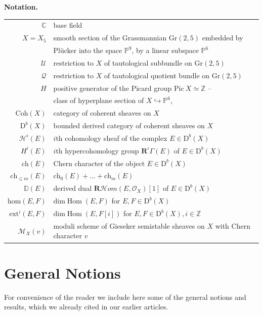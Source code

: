 \documentclass{amsart}
\DeclareMathOperator{\Hom}{Hom}
\def\Z{\ensuremath{\mathbb{Z}}}
\begin{document}
	\textbf{Notation.}
	\begin{center}
		\begin{tabular}{ r l }
			$\mathbb C$ & base field\ \\
			$X=X_5$ & smooth section of the Grassmannian $\mathrm{Gr}(2,5)$ embedded by\\
			& Pl\"ucker into the space $\mathbb P^9$, by a linear subspace $\mathbb P^6$\\
			$\mathcal U$ & restriction to $X$ of tautological subbundle on $\mathrm{Gr}(2,5)$\\
			$\mathcal Q$ & restriction to $X$ of tautological quotient bundle on $\mathrm{Gr}(2,5)$\\
			$H$ & positive generator of the Picard group $\mathrm{Pic}\ X\simeq\Z$ --\\ &
			class of hyperplane section of $X\hookrightarrow
			\mathbb P^6$,\\
			$\mathrm{Coh}(X)$ & category of coherent sheaves on $X$\\
			$\mathrm D^b(X)$ & bounded derived category of coherent sheaves on
			$X$\\
			$\mathcal H^{i}(E)$ & $i$th cohomology sheaf of the complex $E\in\mathrm
			D^b(X)$ \\
			$H^{i}(E)$ & $i$th hypercohomology group $\mathbf R^i\Gamma(E)$ of $E\in\mathrm
			D^b(X)$\\
			$\mathrm{ch}(E)$ & Chern character of the object $E \in\mathrm D^b(X)$ \\
			$\mathrm{ch}_{\le m}(E)$ & $\mathrm{ch}_0(E)+ \ldots+ \mathrm{ch}_m(E)$ \\
			$\mathbb D(E)$ & derived dual $\mathbf{R}\mathcal{H}om(E,\mathcal O_X)[1]$ of $E\in\mathrm
			D^b(X)$ \\
			$\mathrm{hom}(E,F)$ & $\mathrm{dim} \Hom(E,F)$ for $E,F\in\mathrm D^b(X)$ \\
			$\mathrm{ext}^i(E,F)$ & $\mathrm{dim} \Hom(E,F[i])$ for $E,F\in\mathrm D^b(X),i\in\mathbb Z$ \\
			$\mathcal M_X(v)$ & moduli scheme of Gieseker semistable sheaves on $X$ with Chern character $v$
		\end{tabular}
	\end{center}
	
	\section{General Notions}
	\label{derived category}
	For convenience of the reader we include here some of the general notions and results, which we already cited in our earlier articles.
	
\end{document}
